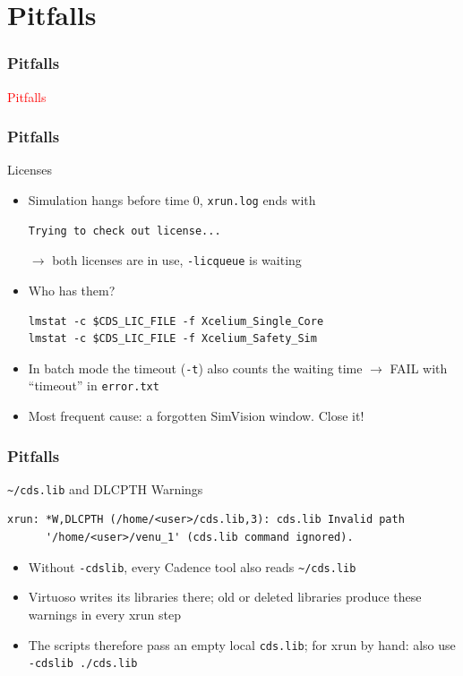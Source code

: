 \documentclass{beamer}
\newcommand{\astitle}{nix}
\newcommand{\assubtitle}{nix}
\newcommand{\cmd}[1]{\texttt{#1}}
\begin{document}
\section{Pitfalls}
\renewcommand{\astitle}{Pitfalls}
\begin{frame}
\frametitle{\astitle}
\textcolor{red}{Pitfalls}
\end{frame}

\renewcommand{\assubtitle}{Licenses}
\begin{frame}[fragile]
\frametitle{\astitle}
\begin{block}{\assubtitle}
  \begin{itemize}
    \item Simulation hangs before time 0, \cmd{xrun.log} ends with
\begin{lstlisting}
Trying to check out license...
\end{lstlisting}
      $\rightarrow$ both licenses are in use, \cmd{-licqueue} is waiting
    \item Who has them?
\begin{lstlisting}[style=sh]
lmstat -c $CDS_LIC_FILE -f Xcelium_Single_Core
lmstat -c $CDS_LIC_FILE -f Xcelium_Safety_Sim
\end{lstlisting}
    \item In batch mode the timeout (\cmd{-t}) also counts the waiting time
      $\rightarrow$ FAIL with ``timeout'' in \cmd{error.txt}
    \item Most frequent cause: a forgotten SimVision window. Close it!
  \end{itemize}
\end{block}
\end{frame}

\renewcommand{\assubtitle}{\texttt{\textasciitilde/cds.lib} and DLCPTH Warnings}
\begin{frame}[fragile]
\frametitle{\astitle}
\begin{block}{\assubtitle}
\begin{lstlisting}
xrun: *W,DLCPTH (/home/<user>/cds.lib,3): cds.lib Invalid path
      '/home/<user>/venu_1' (cds.lib command ignored).
\end{lstlisting}
  \begin{itemize}
    \item Without \cmd{-cdslib}, every Cadence tool also reads \cmd{\textasciitilde/cds.lib}
    \item Virtuoso writes its libraries there; old or deleted libraries
      produce these warnings in every xrun step
    \item The scripts therefore pass an empty local \cmd{cds.lib};
      for xrun by hand: also use \cmd{-cdslib ./cds.lib}
  \end{itemize}
\end{block}
\end{frame}
\end{document}
